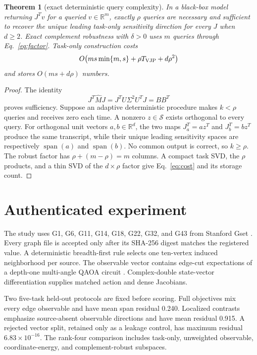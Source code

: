 \documentclass[10pt,letterpaper,twoside]{article}
\newtheorem{theorem}{Theorem}
\newcommand{\R}{\mathbb R}
\newcommand{\J}{J}
\newcommand{\M}{M}
\begin{document}
\begin{theorem}[exact deterministic query complexity]
\label{thm:query}
In a black-box model returning $\J^Tv$ for a queried $v\in\R^m$, exactly
$\rho$ queries are necessary and sufficient to recover the unique leading
task-only sensitivity direction for every $\J$ when $d\ge2$.  Exact
complement robustness with $\delta>0$ uses $m$ queries through
Eq.~\eqref{eq:factor}.  Task-only construction costs
\begin{equation}
 O\!\left(ms\min\{m,s\}+\rho T_{\rm VJP}+d\rho^2\right)
                                                               \label{eq:cost}
\end{equation}
and stores $O(ms+d\rho)$ numbers.
\end{theorem}

\begin{proof}
The identity
\begin{equation}
 \J^T\widehat\M\J=\J^TU\Sigma^2U^T\J=BB^T
\end{equation}
proves sufficiency.  Suppose an adaptive deterministic procedure makes
$k<\rho$ queries and receives zero each time.  A nonzero
$z\in\mathcal S$ exists orthogonal to every query.  For orthogonal unit
vectors $a,b\in\R^d$, the two maps
$\J_a^T=az^T$ and $\J_b^T=bz^T$ produce the same transcript, while their
unique leading sensitivity spaces are respectively $\operatorname{span}(a)$
and $\operatorname{span}(b)$.  No common output is correct, so $k\ge\rho$.
The robust factor has $\rho+(m-\rho)=m$ columns.  A compact task SVD, the
$\rho$ products, and a thin SVD of the $d\times\rho$ factor give
Eq.~\eqref{eq:cost} and its storage count.
\end{proof}

\section{Authenticated experiment}

The study uses G1, G6, G11, G14, G18, G22, G32, and G43 from Stanford Gset
\cite{ye2003gset}.  Every graph file is accepted only after its SHA-256 digest
matches the registered value.  A deterministic breadth-first rule selects one
ten-vertex induced neighborhood per source.  The observable vector contains
edge-cut expectations of a depth-one multi-angle QAOA circuit
\cite{farhi2014qaoa,hadfield2019alternating,herrman2022multiangle}.
Complex-double state-vector differentiation supplies matched action and dense
Jacobians.

Two five-task held-out protocols are fixed before scoring.  Full objectives
mix every edge observable and have mean span residual 0.240.  Localized
contrasts emphasize source-absent observable directions and have mean residual
0.915.  A rejected vector split, retained only as a leakage control, has
maximum residual $6.83\times10^{-16}$.  The rank-four comparison includes
task-only, unweighted observable, coordinate-energy, and complement-robust
subspaces.
\end{document}
